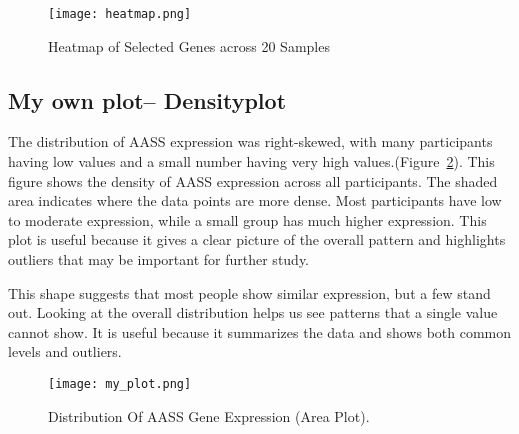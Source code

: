 \documentclass{article}
\begin{document}
\begin{figure}[H]
  \centering
  \texttt{[image: heatmap.png]}
  \caption{Heatmap of Selected Genes across 20 Samples}
  \label{fig:heatmap}
\end{figure}




\subsection{My own plot-- Densityplot}
The distribution of AASS expression was right-skewed, with many participants having low values and a small number having very high values.(Figure~\ref{fig:area}). 
This figure shows the density of AASS expression across all participants. 
The shaded area indicates where the data points are more dense. 
Most participants have low to moderate expression, while a small group has much higher expression. 
This plot is useful because it gives a clear picture of the overall pattern and highlights outliers that may be important for further study.


This shape suggests that most people show similar expression, but a few stand out. 
Looking at the overall distribution helps us see patterns that a single value cannot show. 
It is useful because it summarizes the data and shows both common levels and outliers.
\begin{figure}[!htbp]
  \centering
  \texttt{[image: my\_plot.png]}
  \caption{Distribution Of AASS Gene Expression (Area Plot). 
 }
  \label{fig:area}
\end{figure}









 
     
\end{document}
